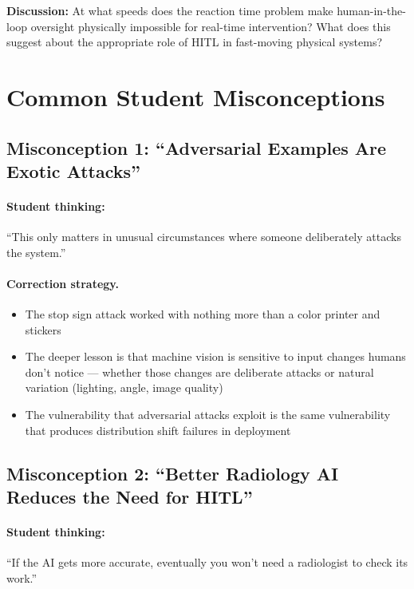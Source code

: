 \textbf{Discussion:} At what speeds does the reaction time problem make human-in-the-loop oversight physically impossible for real-time intervention? What does this suggest about the appropriate role of HITL in fast-moving physical systems?

\section{Common Student Misconceptions}

\subsection{Misconception 1: ``Adversarial Examples Are Exotic Attacks''}

\paragraph{Student thinking:} ``This only matters in unusual circumstances where someone deliberately attacks the system.''

\paragraph{Correction strategy.}
\begin{itemize}
    \item The stop sign attack worked with nothing more than a color printer and stickers
    \item The deeper lesson is that machine vision is sensitive to input changes humans don't notice --- whether those changes are deliberate attacks or natural variation (lighting, angle, image quality)
    \item The vulnerability that adversarial attacks exploit is the same vulnerability that produces distribution shift failures in deployment
\end{itemize}

\subsection{Misconception 2: ``Better Radiology AI Reduces the Need for HITL''}

\paragraph{Student thinking:} ``If the AI gets more accurate, eventually you won't need a radiologist to check its work.''

